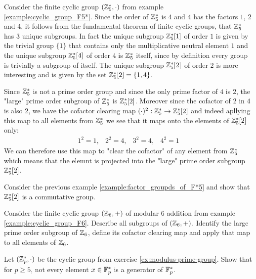 \begin{example}\label{example:factor_groupds_of_F*5} Consider the finite cyclic group $(\mathbb{Z}_5^*,\cdot)$ from example \ref{example:cyclic_group_F5*}. Since the order of $\mathbb{Z}^*_5$ is $4$ and $4$ has the factors $1$, $2$ and $4$, it follows from the fundamental theorem of finite cyclic groups, that $\mathbb{Z}^*_5$ has $3$ unique subgroups. In fact the unique subgroup $\mathbb{Z}^*_5[1]$ of order $1$ is given by the trivial group $\{1\}$ that contains only the multiplicative neutral element $1$ and the unique subgroup $\mathbb{Z}^*_5[4]$ of order $4$ is $\mathbb{Z}^*_5$ itself, since by definition every group is trivially a subgroup of itself. The unique subgroup $\mathbb{Z}^*_5[2]$ of order $2$ is more interesting and is given by the set $\mathbb{Z}^*_5[2]=\{1,4\}$.

Since $\mathbb{Z}^*_5$ is not a prime order group and since the only prime factor of $4$ is $2$, the "large" prime order subgroup of $\mathbb{Z}^*_5$ is $\mathbb{Z}^*_5[2]$. Moreover since the cofactor of $2$ in $4$ is also $2$, we have the cofactor clearing map $(\cdot)^2:\mathbb{Z}^*_5 \to \mathbb{Z}^*_5[2]$ and indeed apllying this map to all elements from $\mathbb{Z}^*_5$ we see that it maps onto the elements of $\mathbb{Z}^*_5[2]$ only:
$$
\begin{array}{cccc}
1^2 = 1, & 2^2 = 4, & 3^2 = 4, & 4^2 = 1
\end{array}
$$
We can therefore use this map to "clear the cofactor" of any element from $\mathbb{Z}^*_5$ which means that the elemnt is projected into the "large" prime order subgroup $\mathbb{Z}^*_5[2]$.
\end{example}
\begin{exercise}Consider the previous example \ref{example:factor_groupds_of_F*5} and show that $\mathbb{Z}^*_5[2]$ is a commutative group.
\end{exercise}
\begin{exercise}
Consider the finite cyclic group $(\mathbb{Z}_6,+)$ of modular 6 addition from example \ref{example:cyclic_group_F6}. Describe all subgroups of $(\mathbb{Z}_6,+)$. Identify the large prime order subgroup of $\mathbb{Z}_6$, define its cofactor clearing map and apply that map to all elements of $\mathbb{Z}_6$.
\end{exercise}
\begin{exercise}Let $(\mathbb{Z}_p^*,\cdot)$ be the cyclic group from exercise \ref{ex:modulus-prime-group}. Show that for $p\geq 5$, not every element $x\in \mathbb{F}_p^*$ is a generator of $\mathbb{F}_p^*$.
\end{exercise}
